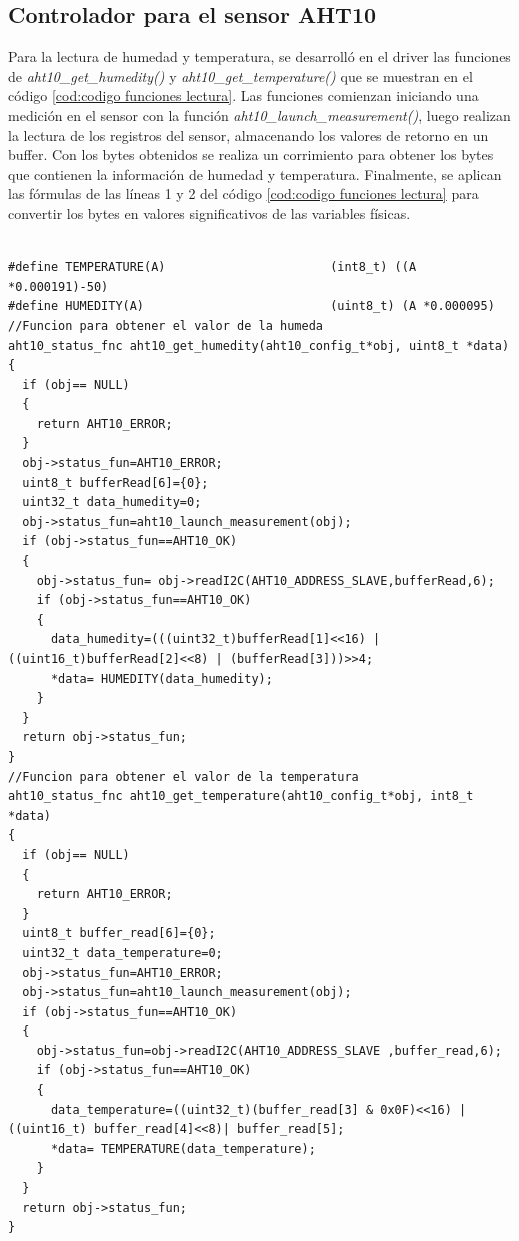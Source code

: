 \subsection{Controlador para el sensor AHT10} 

Para la lectura de humedad y temperatura, se desarrolló en el driver las funciones de \emph{aht10\_get\_humedity()} y \emph{aht10\_get\_temperature()} que se muestran en el código \ref{cod:codigo funciones lectura}.
Las funciones comienzan iniciando una medición en el sensor con la función \emph{aht10\_launch\_measurement()}, luego realizan la lectura de los registros del sensor, almacenando los valores de retorno en un buffer. Con los bytes obtenidos se realiza un corrimiento para  obtener los bytes que contienen la información de humedad y temperatura. Finalmente, se aplican las fórmulas de las líneas 1 y 2 del código \ref{cod:codigo funciones lectura} para convertir los bytes en valores significativos de las variables físicas.
 
\begin{lstlisting}[label=cod:codigo funciones lectura ,caption=Funciones de lectura de humedad y temperatura.]  % Start your code-block

#define TEMPERATURE(A)                       (int8_t) ((A *0.000191)-50)       
#define HUMEDITY(A)                          (uint8_t) (A *0.000095)        
//Funcion para obtener el valor de la humeda
aht10_status_fnc aht10_get_humedity(aht10_config_t*obj, uint8_t *data)
{
  if (obj== NULL)
  {
    return AHT10_ERROR;
  }
  obj->status_fun=AHT10_ERROR;
  uint8_t bufferRead[6]={0};
  uint32_t data_humedity=0;
  obj->status_fun=aht10_launch_measurement(obj);
  if (obj->status_fun==AHT10_OK)
  {
    obj->status_fun= obj->readI2C(AHT10_ADDRESS_SLAVE,bufferRead,6);
    if (obj->status_fun==AHT10_OK)
    {
      data_humedity=(((uint32_t)bufferRead[1]<<16) | ((uint16_t)bufferRead[2]<<8) | (bufferRead[3]))>>4;
      *data= HUMEDITY(data_humedity);
    }
  }
  return obj->status_fun;
}
//Funcion para obtener el valor de la temperatura 
aht10_status_fnc aht10_get_temperature(aht10_config_t*obj, int8_t *data)
{
  if (obj== NULL)
  {
    return AHT10_ERROR;
  } 
  uint8_t buffer_read[6]={0};
  uint32_t data_temperature=0;
  obj->status_fun=AHT10_ERROR;
  obj->status_fun=aht10_launch_measurement(obj);
  if (obj->status_fun==AHT10_OK)
  {
    obj->status_fun=obj->readI2C(AHT10_ADDRESS_SLAVE ,buffer_read,6);
    if (obj->status_fun==AHT10_OK)
    {
      data_temperature=((uint32_t)(buffer_read[3] & 0x0F)<<16) | ((uint16_t) buffer_read[4]<<8)| buffer_read[5];
      *data= TEMPERATURE(data_temperature);
    }
  }
  return obj->status_fun;
}
\end{lstlisting}

